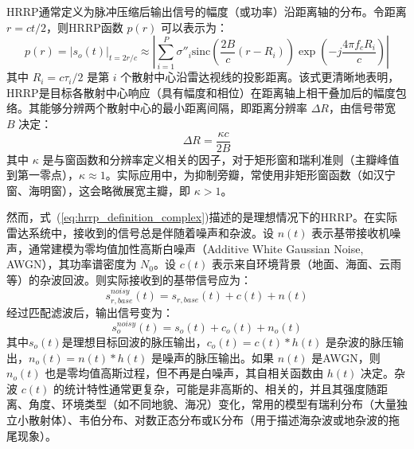 HRRP通常定义为脉冲压缩后输出信号的幅度（或功率）沿距离轴的分布。令距离 $r = ct/2$，则HRRP函数 $p(r)$ 可以表示为：
\begin{equation}
    p(r) = |s_o(t)|_{t=2r/c} \approx \left| \sum_{i=1}^{P} \sigma''_i \text{sinc}\left(\frac{2B}{c}(r - R_i)\right) \exp(-j \frac{4\pi f_c R_i}{c}) \right|
    \label{eq:hrrp_definition_complex}
\end{equation}
其中 $R_i = c\tau_i/2$ 是第 $i$ 个散射中心沿雷达视线的投影距离。该式更清晰地表明，HRRP是目标各散射中心响应（具有幅度和相位）在距离轴上相干叠加后的幅度包络。其能够分辨两个散射中心的最小距离间隔，即距离分辨率 $\Delta R$，由信号带宽 $B$ 决定：
\begin{equation}
    \Delta R = \frac{\kappa c}{2B}
    \label{eq:range_resolution_kappa}
\end{equation}
其中 $\kappa$ 是与窗函数和分辨率定义相关的因子，对于矩形窗和瑞利准则（主瓣峰值到第一零点），$\kappa \approx 1$。实际应用中，为抑制旁瓣，常使用非矩形窗函数（如汉宁窗、海明窗），这会略微展宽主瓣，即 $\kappa > 1$。

然而，式~(\ref{eq:hrrp_definition_complex})描述的是理想情况下的HRRP。在实际雷达系统中，接收到的信号总是伴随着噪声和杂波。设 $n(t)$ 表示基带接收机噪声，通常建模为零均值加性高斯白噪声（Additive White Gaussian Noise, AWGN），其功率谱密度为 $N_0$。设 $c(t)$ 表示来自环境背景（地面、海面、云雨等）的杂波回波。则实际接收到的基带信号应为：
\begin{equation}
    s_{r,base}^{noisy}(t) = s_{r,base}(t) + c(t) + n(t)
    \label{eq:received_noisy}
\end{equation}
经过匹配滤波后，输出信号变为：
\begin{equation}
    s_o^{noisy}(t) = s_o(t) + c_o(t) + n_o(t)
    \label{eq:output_noisy}
\end{equation}
其中$s_o(t)$是理想目标回波的脉压输出，$c_o(t) = c(t) * h(t)$ 是杂波的脉压输出，$n_o(t) = n(t) * h(t)$ 是噪声的脉压输出。如果 $n(t)$ 是AWGN，则 $n_o(t)$ 也是零均值高斯过程，但不再是白噪声，其自相关函数由 $h(t)$ 决定。杂波 $c(t)$ 的统计特性通常更复杂，可能是非高斯的、相关的，并且其强度随距离、角度、环境类型（如不同地貌、海况）变化，常用的模型有瑞利分布（大量独立小散射体）、韦伯分布、对数正态分布或K分布（用于描述海杂波或地杂波的拖尾现象）。

